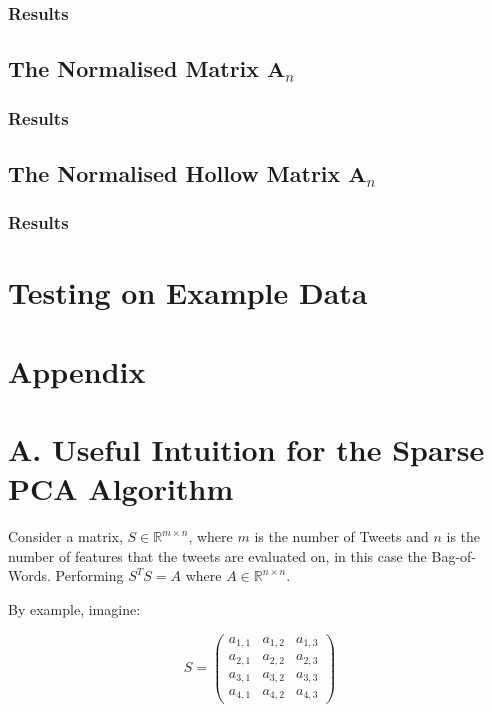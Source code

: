 \documentclass[11pt,a4paper]{article}
\begin{document}
\subsubsection{Results}

\subsection{The Normalised Matrix $\mathbf{A}_{n}$}
\subsubsection{Results}


\subsection{The Normalised Hollow Matrix $\mathbf{A}_{n}$}
\subsubsection{Results}
\section{Testing on Example Data}

\clearpage


\clearpage

\section*{Appendix}

\section*{A. Useful Intuition for the Sparse PCA Algorithm}
Consider a matrix, $S\in \mathbb{R}^{m\times n}$, where $m$ is the number of Tweets and $n$ is the number of features that the tweets are evaluated on, in this case the Bag-of-Words. Performing $S^TS = A$ where $A \in \mathbb{R}^{n\times n}$. 

By example, imagine:

\begin{equation}
S = \left( \begin{matrix}
a_{1, 1} & a_{1, 2} & a_{1, 3} \\ 
a_{2, 1} & a_{2, 2} & a_{2, 3} \\
a_{3, 1} & a_{3, 2} & a_{3, 3} \\
a_{4, 1} & a_{4, 2} & a_{4, 3} 
\end{matrix} \right)
\end{equation}
\end{document}
